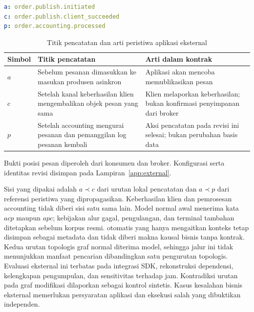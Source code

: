 \begin{lstlisting}[language=yaml,caption={Pemetaan peristiwa awal aplikasi eksternal},label={lst:external-events}]
a: order.publish.initiated
c: order.publish.client_succeeded
p: order.accounting.processed
\end{lstlisting}

\begin{table}[H]
  \centering\small
  \caption{Titik pencatatan dan arti peristiwa aplikasi eksternal}
  \label{tab:external-checkpoints}
  \begin{tabularx}{\textwidth}{@{}>{\raggedright\arraybackslash}p{1.2cm}>{\raggedright\arraybackslash}X>{\raggedright\arraybackslash}X@{}}
    \toprule
    Simbol & Titik pencatatan & Arti dalam kontrak \\
    \midrule
    $a$ & Sebelum pesanan dimasukkan ke masukan produsen asinkron & Aplikasi akan mencoba memublikasikan pesan \\
    $c$ & Setelah kanal keberhasilan klien mengembalikan objek pesan yang sama & Klien melaporkan keberhasilan; bukan konfirmasi penyimpanan dari broker \\
    $p$ & Setelah accounting mengurai pesanan dan pemanggilan log pesanan kembali & Aksi pencatatan pada revisi ini selesai; bukan perubahan basis data \\
    \bottomrule
  \end{tabularx}
\end{table}

Bukti posisi pesan diperoleh dari konsumen dan broker. Konfigurasi serta identitas revisi disimpan pada Lampiran~\ref{app:external}.

Sisi yang dipakai adalah $a\prec c$ dari urutan lokal pencatatan dan $a\prec p$ dari referensi peristiwa yang dipropagasikan. Keberhasilan klien dan pemrosesan accounting tidak diberi sisi satu sama lain. Model normal awal menerima kata $acp$ maupun $apc$; kebijakan alur gagal, pengulangan, dan terminal tambahan ditetapkan sebelum korpus resmi.  otomatis yang hanya mengaitkan konteks tetap disimpan sebagai metadata dan tidak diberi makna kausal bisnis tanpa kontrak. Kedua urutan topologis graf normal diterima model, sehingga jalur ini tidak menunjukkan manfaat pencarian dibandingkan satu pengurutan topologis. Evaluasi eksternal ini terbatas pada integrasi SDK, rekonstruksi dependensi, kelengkapan pengumpulan, dan sensitivitas terhadap jam. Kontradiksi urutan pada graf modifikasi dilaporkan sebagai kontrol sintetis. Kasus kesalahan bisnis eksternal memerlukan persyaratan aplikasi dan eksekusi salah yang dibuktikan independen.

